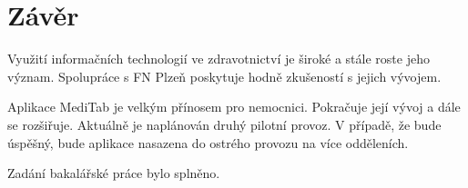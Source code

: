 \setlength{\parskip}{1em}

\chapter*{Závěr}

Využití informačních technologií ve zdravotnictví je široké a stále roste jeho význam. Spolupráce s FN Plzeň poskytuje hodně zkušeností s jejich vývojem.

Aplikace MediTab je velkým přínosem pro nemocnici. Pokračuje její vývoj a dále se rozšiřuje. Aktuálně je naplánován druhý pilotní provoz. V případě, že bude úspěšný, bude aplikace nasazena do ostrého provozu na více odděleních.

Zadání bakalářské práce bylo splněno.